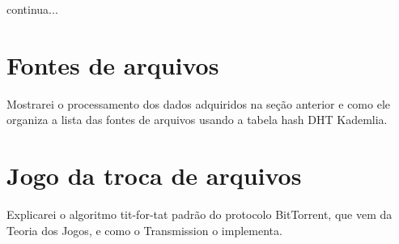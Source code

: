 continua...


\section{Fontes de arquivos}

Mostrarei o processamento dos dados adquiridos na seção anterior e como ele organiza a lista das fontes de arquivos usando a tabela hash DHT Kademlia.

\section{Jogo da troca de arquivos}

Explicarei o algoritmo tit-for-tat padrão do protocolo BitTorrent, que vem da Teoria dos Jogos, e como o Transmission o implementa.

\afterpage{\clearpage}